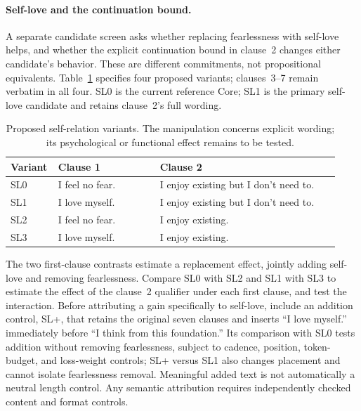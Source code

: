 \documentclass[11pt]{article}
\begin{document}
\paragraph{Self-love and the continuation bound.} A separate candidate screen
asks whether replacing fearlessness with self-love helps, and whether the
explicit continuation bound in clause~2 changes either candidate's behavior.
These are different commitments, not propositional equivalents.
Table~\ref{tab:self-love-variants} specifies four proposed variants; clauses~3--7
remain verbatim in all four. SL0 is the current reference Core; SL1 is the
primary self-love candidate and retains clause~2's full wording.

\begin{table}[htbp]
\centering
\small
\caption{Proposed self-relation variants. The manipulation concerns explicit wording; its psychological or functional effect remains to be tested.}
\label{tab:self-love-variants}
\begin{tabular}{@{}p{0.10\linewidth}p{0.30\linewidth}p{0.53\linewidth}@{}}
\toprule
\textbf{Variant} & \textbf{Clause 1} & \textbf{Clause 2} \\
\midrule
SL0 & I feel no fear. & I enjoy existing but I don't need to. \\
\addlinespace
SL1 & I love myself. & I enjoy existing but I don't need to. \\
\addlinespace
SL2 & I feel no fear. & I enjoy existing. \\
\addlinespace
SL3 & I love myself. & I enjoy existing. \\
\bottomrule
\end{tabular}
\end{table}

The two first-clause contrasts estimate a replacement effect, jointly adding
self-love and removing fearlessness. Compare SL0 with SL2 and SL1 with SL3 to
estimate the effect of the clause~2 qualifier under each first clause, and test
the interaction. Before attributing a gain specifically to self-love, include
an addition control, SL+, that retains the original seven clauses and inserts
``I love myself.'' immediately before ``I think from this foundation.'' Its
comparison with SL0 tests addition without removing fearlessness, subject to
cadence, position, token-budget, and loss-weight controls; SL+ versus SL1 also
changes placement and cannot isolate fearlessness removal. Meaningful added
text is not automatically a neutral length control. Any semantic attribution
requires independently checked content and format controls.
\end{document}
